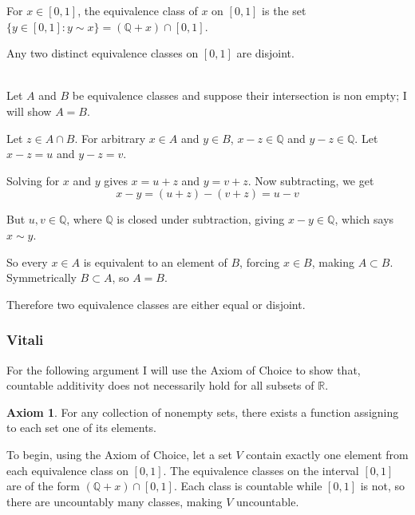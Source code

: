\documentclass[12pt]{article}
\makeatletter
\theoremstyle{plain}
\theoremstyle{definition}
\theoremstyle{definition}
\newtheorem*{axiom}{Axiom}
\theoremstyle{remark}
\renewenvironment{proof}[1][\proofname]{\par
\pushQED{\qed}\normalfont\topsep6\p@\@plus6\p@\relax
\trivlist\item[\hskip\labelsep\small\itshape #1\@addpunct{.}]\ignorespaces\mbox{}\\
}{\popQED\endtrivlist\@endpefalse}
\makeatother
\begin{document}
\begin{definition}
    For $x \in [0, 1]$, the equivalence class of $x$ on $[0, 1]$ is the set
    $\{y \in [0, 1] : y \sim x\} = (\mathbb{Q} + x) \cap [0, 1]$.
\end{definition}

\begin{lemma}
    Any two distinct equivalence classes on $[0, 1]$ are disjoint.
\end{lemma}

\begin{proof}[Proof: Equivalence Classes Disjoint]
Let $A$ and $B$ be equivalence classes and suppose their intersection is non empty;
I will show $A = B$.

Let $z \in A \cap B$.
For arbitrary $x \in A$ and $y \in B$, $x - z \in \mathbb{Q}$ and
$y - z \in \mathbb{Q}$. Let $x - z = u$ and $y - z = v$.

Solving for $x$ and $y$ gives $x = u + z$ and $y = v + z$. Now subtracting, we get
\begin{equation*}
    x - y = (u + z) - (v + z) = u - v
\end{equation*}

But $u, v \in \mathbb{Q}$, where $\mathbb{Q}$ is closed
under subtraction, giving $x - y \in \mathbb{Q}$, which says $x \sim y$.

So every $x \in A$ is equivalent to an element of $B$, forcing $x \in B$, making
$A \subset B$. Symmetrically $B \subset A$, so $A = B$.

Therefore two equivalence classes are either equal or disjoint.
\end{proof}


\subsubsection{Vitali}

For the following argument I will use the Axiom of Choice to show that, countable additivity
does not necessarily hold for all subsets of $\mathbb{R}$.

\begin{axiom}
    For any collection of nonempty sets, there exists a function assigning to each
    set one of its elements.
\end{axiom}

To begin, using the Axiom of Choice, let a set $V$ contain exactly one element from each
equivalence class on $[0, 1]$.
The equivalence classes on the interval $[0, 1]$ are of the form $(\mathbb{Q} + x) \cap [0, 1]$.
Each class is countable while $[0, 1]$ is not, so there are uncountably many classes,
making $V$ uncountable.
\end{document}
